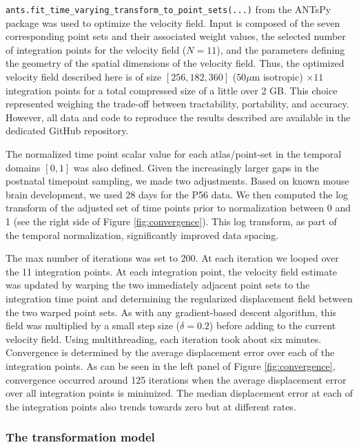 \documentclass[
  12pt,
]{article}
\begin{document}
\texttt{ants.fit\_time\_varying\_transform\_to\_point\_sets(...)} from
the ANTsPy package was used to optimize the velocity field. Input is
composed of the seven corresponding point sets and their associated
weight values, the selected number of integration points for the
velocity field (\(N=11\)), and the parameters defining the geometry of
the spatial dimensions of the velocity field. Thus, the optimized
velocity field described here is of size \([256, 182, 360]\)
(\(50 \mu\)m isotropic) \(\times 11\) integration points for a total
compressed size of a little over 2 GB. This choice represented weighing
the trade-off between tractability, portability, and accuracy. However,
all data and code to reproduce the results described are available in
the dedicated GitHub repository.

The normalized time point scalar value for each atlas/point-set in the
temporal domains \([0, 1]\) was also defined. Given the increasingly
larger gaps in the postnatal timepoint sampling, we made two
adjustments. Based on known mouse brain development, we used 28 days for
the P56 data. We then computed the log transform of the adjusted set of
time points prior to normalization between 0 and 1 (see the right side
of Figure \ref{fig:convergence}). This log transform, as part of the
temporal normalization, significantly improved data spacing.

The max number of iterations was set to 200. At each iteration we looped
over the 11 integration points. At each integration point, the velocity
field estimate was updated by warping the two immediately adjacent point
sets to the integration time point and determining the regularized
displacement field between the two warped point sets. As with any
gradient-based descent algorithm, this field was multiplied by a small
step size (\(\delta = 0.2\)) before adding to the current velocity
field. Using multithreading, each iteration took about six minutes.
Convergence is determined by the average displacement error over each of
the integration points. As can be seen in the left panel of Figure
\ref{fig:convergence}, convergence occurred around 125 iterations when
the average displacement error over all integration points is minimized.
The median displacement error at each of the integration points also
trends towards zero but at different rates.

\hypertarget{the-transformation-model}{%
\subsubsection{The transformation
model}\label{the-transformation-model}}
\end{document}
